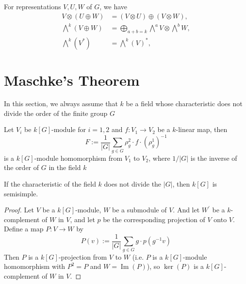 \documentclass[12pt, oneside]{book}
\begin{document}
\begin{proposition}
    For representations $V,U,W$ of $G$, we have
    \begin{equation*}
        \begin{aligned}
            V \otimes(U \oplus W)       & =(V \otimes U) \oplus(V \otimes W),                     \\
            \bigwedge^k(V \oplus W)     & =\bigoplus_{a+b=k} \bigwedge^a V \otimes \bigwedge^b W, \\
            \bigwedge^k\left(V^*\right) & =\bigwedge^k(V)^*,
        \end{aligned}
    \end{equation*}
\end{proposition}



\section{Maschke's Theorem}
In this section, we always assume that $k$ be a field whose characteristic does not divide the order of the finite group $G$
\begin{lemma}
    Let $V_i$ be $k[G]$-module for $i=1,2$ and $f:V_1\rightarrow V_2$ be a $k$-linear map, then
    \begin{equation*}
        F
        :=
        \frac{1}{\left|G\right|} \sum_{g \in G} \rho_g^2 \cdot f \cdot \left(\rho_g^1\right)^{-1}
    \end{equation*}
    is a $k[G]$-module homomorphism from $V_1$ to $V_2$, where $1/\left|G\right|$ is the inverse of the order of $G$ in the field $k$
\end{lemma}

\begin{theorem}[Maschke]
    If the characteristic of the field $k$ does not divide the $\left|G\right|$, then $k[G]$ is semisimple.
    \begin{proof}
        Let $V$ be a $k[G]$-module, $W$ be a submodule of $V$. And let $W^{\prime}$ be a $k$-complement of $W$ in $V$, and let $p$ be the corresponding projection of $V$ onto $V$.
        Define a map $P: V \rightarrow W$ by
        \begin{equation*}
            P(v)
            :=
            \frac{1}{\left|G\right|} \sum_{g \in G} g \cdot p\left( g^{-1}v\right)
        \end{equation*}
        Then $P$ is a $k[G]$-projection from $V$ to $W$ (i.e. $P$ is a $k[G]$-module homomorphism with $P^2 = P$ and $W=\operatorname{Im}(P)$), so $\ker(P)$ is a $k[G]$-complement of $W$ in $V$.
    \end{proof}
\end{theorem}
\end{document}
